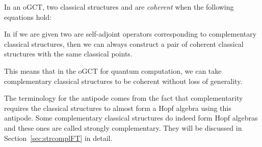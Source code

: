%

\begin{defn}\label{def:coherence}
In an oGCT, two classical structures  and  are \emph{coherent} when the following equations hold:
\begin{equation}
\label{eq:coherence}
 
\end{equation}
\end{defn}

\begin{proposition}
\label{prop:cohere}
In  if we are given two are self-adjoint operators corresponding to complementary classical structures, then we can always construct a pair of coherent classical structures with the same classical points.
\end{proposition}
\noindent This means that in the oGCT for quantum computation, we can take complementary classical structures to be coherent without loss of generality.

The terminology for the antipode comes from the fact that complementarity requires the classical structures to almost form a Hopf algebra using this antipode. Some complementary classical structures do indeed form Hopf algebras and these ones are called strongly complementary. They will be discussed in Section~\ref{sec:strcomplFT} in detail.

